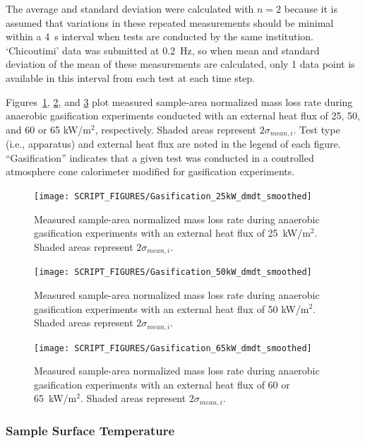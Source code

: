 \documentclass{book}
\begin{document}
The average and standard deviation were calculated with $n=2$ because it is assumed that variations in these repeated measurements should be minimal within a 4~s interval when tests are conducted by the same institution. `Chicoutimi' data was submitted at 0.2~Hz, so when mean and standard deviation of the mean of these measurements are calculated, only 1 data point is available in this interval from each test at each time step.

Figures~\ref{Fig:Gasification_25kW_dmdt}, \ref{Fig:Gasification_50kW_dmdt}, and \ref{Fig:Gasification_65kW_dmdt} plot measured sample-area normalized mass loss rate during anaerobic gasification experiments conducted with an external heat flux of 25, 50, and 60 or 65 kW/m$^2$, respectively. Shaded areas represent $2\sigma_{mean,i}$. Test type (i.e., apparatus) and external heat flux are noted in the legend of each figure. ``Gasification'' indicates that a given test was conducted in a controlled atmosphere cone calorimeter modified for gasification experiments.

\begin{figure}
  \centering
  \texttt{[image: SCRIPT\_FIGURES/Gasification\_25kW\_dmdt\_smoothed]}
  \caption{Measured sample-area normalized mass loss rate during anaerobic gasification experiments with an external heat flux of 25~kW/m$^2$. Shaded areas represent $2\sigma_{mean,i}$.}
  \label{Fig:Gasification_25kW_dmdt}
\end{figure}

\begin{figure}
  \centering
  \texttt{[image: SCRIPT\_FIGURES/Gasification\_50kW\_dmdt\_smoothed]}
  \caption{Measured sample-area normalized mass loss rate during anaerobic gasification experiments with an external heat flux of 50 kW/m$^2$. Shaded areas represent $2\sigma_{mean,i}$.}
  \label{Fig:Gasification_50kW_dmdt}
\end{figure}

\begin{figure}
  \centering
  \texttt{[image: SCRIPT\_FIGURES/Gasification\_65kW\_dmdt\_smoothed]}
  \caption{Measured sample-area normalized mass loss rate during anaerobic gasification experiments with an external heat flux of 60 or 65~kW/m$^2$. Shaded areas represent $2\sigma_{mean,i}$.}
  \label{Fig:Gasification_65kW_dmdt}
\end{figure}

\newpage
\subsubsection{Sample Surface Temperature}
\end{document}
